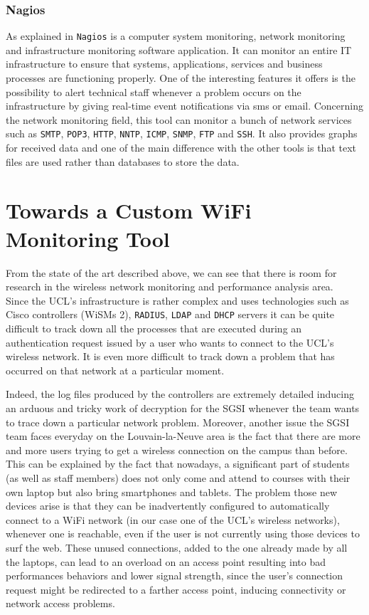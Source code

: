 \subsubsection{Nagios}
As explained in \cite{nagios} \texttt{Nagios} is a computer system monitoring, network monitoring and infrastructure monitoring software application. It can monitor an entire IT infrastructure to ensure that systems, applications, services and business processes are functioning properly. One of the interesting features it offers is the possibility to alert technical staff whenever a problem occurs on the infrastructure by giving real-time event notifications via sms or email. Concerning the network monitoring field, this tool can monitor a bunch of network services such as \texttt{SMTP}, \texttt{POP3}, \texttt{HTTP}, \texttt{NNTP}, \texttt{ICMP}, \texttt{SNMP}, \texttt{FTP} and \texttt{SSH}. It also provides graphs for received data and one of the main difference with the other tools is that text files are used rather than databases to store the data.


\section{Towards a Custom WiFi Monitoring Tool}
From the state of the art described above, we can see that there is room for research in the wireless network monitoring and performance analysis area.\\
Since the UCL's infrastructure is rather complex and uses technologies such as Cisco controllers (WiSMs 2), \texttt{RADIUS}, \texttt{LDAP} and \texttt{DHCP} servers it can be quite difficult to track down all the processes that are executed during an authentication request issued by a user who wants to connect to the UCL's wireless network. It is even more difficult to track down a problem that has occurred on that network at a particular moment.

Indeed, the log files produced by the controllers are extremely detailed inducing an arduous and tricky work of decryption for the SGSI whenever the team wants to trace down a particular network problem. Moreover, another issue the SGSI team faces everyday on the Louvain-la-Neuve area is the fact that there are more and more users trying to get a wireless connection on the campus than before. This can be explained by the fact that nowadays, a significant part of students (as well as staff members) does not only come and attend to courses with their own laptop but also bring smartphones and tablets. The problem those new devices arise is that they can be inadvertently configured to automatically connect to a WiFi network (in our case one of the UCL's wireless networks), whenever one is reachable, even if the user is not currently using those devices to surf the web. These unused connections, added to the one already made by all the laptops, can lead to an overload on an access point resulting into bad performances behaviors and lower signal strength, since the user's connection request might be redirected to a farther access point, inducing connectivity or network access problems.


